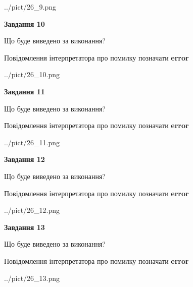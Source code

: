 \documentclass[11pt, ukrainian]{article}
\begin{document}
{\begin {large}
\begin{center}
	{../pict/26_9.png}
\end{center}
\newpage

{\begin {center}\textbf{Завдання 10}\end {center}}\par
Що буде виведено за виконання? \par
Повідомлення інтерпретатора про помилку позначати \textbf{error}

\begin{center}
	{../pict/26_10.png}
\end{center}
\newpage

{\begin {center}\textbf{Завдання 11}\end {center}}\par
Що буде виведено за виконання? \par
Повідомлення інтерпретатора про помилку позначати \textbf{error}

\begin{center}
	{../pict/26_11.png}
\end{center}
\newpage

{\begin {center}\textbf{Завдання 12}\end {center}}\par
Що буде виведено за виконання? \par
Повідомлення інтерпретатора про помилку позначати \textbf{error}

\begin{center}
	{../pict/26_12.png}
\end{center}
\newpage

{\begin {center}\textbf{Завдання 13}\end {center}}\par
Що буде виведено за виконання? \par
Повідомлення інтерпретатора про помилку позначати \textbf{error}

\begin{center}
	{../pict/26_13.png}
\end{center}
\newpage


\end{large}}
\end{document}
